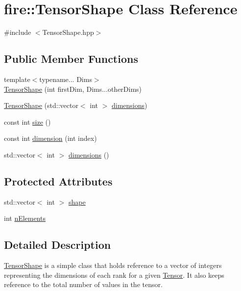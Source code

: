 \hypertarget{a00301}{}\section{fire\+:\+:Tensor\+Shape Class Reference}
\label{a00301}


{\ttfamily \#include $<$Tensor\+Shape.\+hpp$>$}

\subsection*{Public Member Functions}
\begin{DoxyCompactItemize}
\item 
{\footnotesize template$<$typename... Dims$>$ }\\\hyperlink{a00301_a899618b4ea57612bd7fa8a7cdf73d66b}{Tensor\+Shape} (int first\+Dim, Dims...\+other\+Dims)
\item 
\hyperlink{a00301_a0c071ec9da07a6f364f063eb8e2c292f}{Tensor\+Shape} (std\+::vector$<$ int $>$ \hyperlink{a00301_aedcad29b08b96c413686f834df1faca9}{dimensions})
\item 
const int \hyperlink{a00301_a75b374e1e1b1a0f266916d8df69e99ec}{size} ()
\item 
const int \hyperlink{a00301_a57244a10aaf5ce7d3d0f2df74cc76929}{dimension} (int index)
\item 
std\+::vector$<$ int $>$ \hyperlink{a00301_aedcad29b08b96c413686f834df1faca9}{dimensions} ()
\end{DoxyCompactItemize}
\subsection*{Protected Attributes}
\begin{DoxyCompactItemize}
\item 
std\+::vector$<$ int $>$ \hyperlink{a00301_a7c75547b5c68e7ba1d1da6f7bba0b258}{shape}
\item 
int \hyperlink{a00301_aacd43176775cdff868dd47f1577b5255}{n\+Elements}
\end{DoxyCompactItemize}


\subsection{Detailed Description}
\hyperlink{a00301}{Tensor\+Shape} is a simple class that holds reference to a vector of integers representing the dimensions of each rank for a given \hyperlink{a00299}{Tensor}. It also keeps reference to the total number of values in the tensor. 

